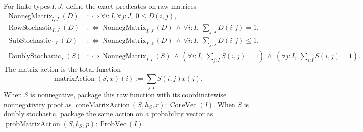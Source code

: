 \documentclass[9pt]{extarticle}
\theoremstyle{definition}
\theoremstyle{remark}
\begin{document}
For finite types $I,J$, define the exact predicates on raw matrices
\begin{align*}
 \operatorname{NonnegMatrix}_{I,J}(D)
 &:\Longleftrightarrow\forall i:I,\forall j:J,\ 0\leq D(i,j),\\
 \operatorname{RowStochastic}_{I,J}(D)
 &:\Longleftrightarrow\operatorname{NonnegMatrix}_{I,J}(D)\ \wedge\
   \forall i:I,\ \sum_{j:J}D(i,j)=1,\\
 \operatorname{SubStochastic}_{I,J}(D)
 &:\Longleftrightarrow\operatorname{NonnegMatrix}_{I,J}(D)\ \wedge\
   \forall i:I,\ \sum_{j:J}D(i,j)\leq1,\\
 \operatorname{DoublyStochastic}_I(S)
 &:\Longleftrightarrow\operatorname{NonnegMatrix}_{I,I}(S)\ \wedge\
   (\forall i:I,\ \sum_{j:I}S(i,j)=1)\ \wedge\
   (\forall j:I,\ \sum_{i:I}S(i,j)=1).
\end{align*}
The matrix action is the total function
\begin{equation}
 \operatorname{matrixAction}(S,x)(i):=\sum_{j:I}S(i,j)x(j).
 \label{eq:foundation-matrix-action}
\end{equation}
When $S$ is nonnegative, package this raw function with its coordinatewise
nonnegativity proof as
$\operatorname{coneMatrixAction}(S,h_S,x):\operatorname{ConeVec}(I)$.
When $S$ is doubly stochastic, package the same action on a probability vector
as
$\operatorname{probMatrixAction}(S,h_S,p):\operatorname{ProbVec}(I)$.
\end{document}

